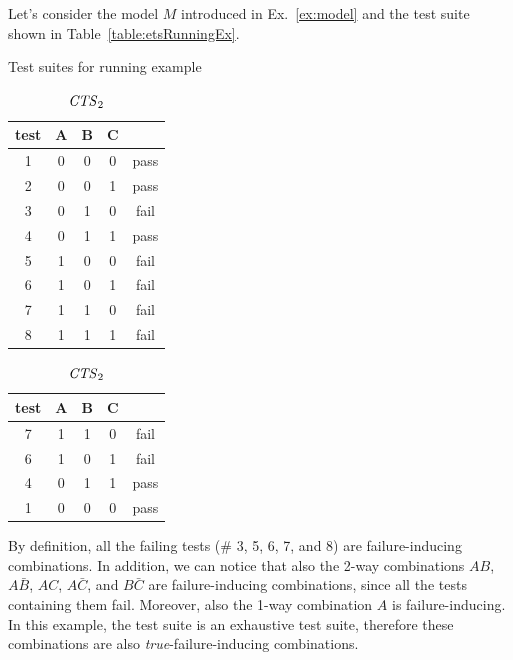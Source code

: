 \begin{tikzborder}{\cite{Gargantini16:validation}}
\begin{tikzborder}{\cite{gargantini_combinatorial_2017}}
\begin{tikzborder}{\cite{gargantini_combinatorial_2017}}
\begin{tikzborder}{\cite{garn2019}}
\begin{tikzborder}{\cite{arcaini2019achieving}}
\begin{example}\label{ex:fic}
\begin{tikzborder}{}
		Let's consider the model $M$ introduced in Ex.~\ref{ex:model} and the test suite shown in Table~\ref{table:etsRunningEx}.
\end{tikzborder}
\begin{table}[!htb]
		\caption{Test suites for running example}
		\centering
		\begin{subtable}[t]{.4\columnwidth}
			\caption{\ets}
			\label{table:etsRunningEx}
			\begin{tabular}{c|ccc|c}
				\toprule
				test &A & B & C & \result\\
				\midrule
				1& 0 & 0 & 0 & pass \\
				2& 0 & 0 & 1 & pass \\
				3& 0 & 1 & 0 & fail\\
				4& 0 & 1 & 1 & pass\\
				5& 1 & 0 & 0 & fail\\
				6& 1 & 0 & 1 & fail\\
				7& 1 & 1 & 0 & fail\\
				8& 1 & 1 & 1 & fail\\
				\bottomrule
			\end{tabular}
		\end{subtable}%
		\begin{subtable}[t]{.4\columnwidth}
			\centering
			\caption{$\mathit{CTS}_2$}
			\label{table:ctsRunningEx}
			\begin{tabular}{c|ccc|c}
				\toprule
				test &A & B & C & \result \\
				\midrule
				7 & 1 & 1 & 0 & fail\\
				6 & 1 & 0 & 1 & fail\\
				4 & 0 & 1 & 1 & pass\\
				1 & 0 & 0 & 0 & pass\\
				\bottomrule
			\end{tabular}
		\end{subtable} 
	\end{table}
\begin{tikzborder}{}
	By definition, all the failing tests (\# 3, 5, 6, 7, and 8) are failure-inducing combinations. In addition, we can notice that also the 2-way combinations $AB$, $A\bar{B}$, $AC$, $A\bar{C}$, and $B\bar{C}$ are failure-inducing combinations, since all the tests containing them fail. Moreover, also the 1-way combination $A$ is failure-inducing. In this example, the test suite is an exhaustive test suite, therefore these combinations are also \textit{true}-failure-inducing combinations.
\end{tikzborder}
\end{example}


\end{tikzborder}
\end{tikzborder}
\end{tikzborder}
\end{tikzborder}
\end{tikzborder}
